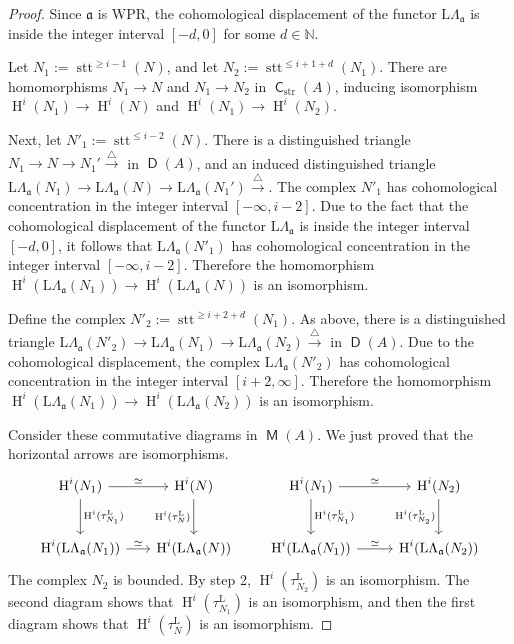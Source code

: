 \documentclass[10pt]{amsart}
\theoremstyle{definition}
\numberwithin{equation}{section}
\newcommand{\xar}{\xrightarrow}
\newcommand{\opn}{\operatorname}
\newcommand{\cat}[1]{\operatorname{\mathsf{#1}}}
\newcommand{\mfrak}[1]{\mathfrak{#1}}
\newcommand{\mrm}[1]{\mathrm{#1}}
\newcommand{\La}{\Lambda}
\renewcommand{\a}{\mfrak{a}}
\newcommand{\N}{\mathbb{N}}
\begin{document}
\begin{proof}
Since $\a$ is WPR, the cohomological displacement of the functor
$\mrm{L} \La_{\a}$ is inside the integer interval $[-d, 0]$ for some
$d \in \N$.

Let
$N_1 := \opn{stt}^{\geq i - 1}(N)$, and let
$N_2 := \opn{stt}^{\leq i + 1 + d}(N_1)$.
There are homomorphisms $N_1 \to N$ and $N_1 \to N_2$ in
$\cat{C}_{\mrm{str}}(A)$, inducing isomorphism
$\opn{H}^i(N_1) \to \opn{H}^i(N)$ and
$\opn{H}^i(N_1) \to \opn{H}^i(N_2)$.

Next, let $N'_1 := \opn{stt}^{\leq i - 2}(N)$.
There is a distinguished triangle
$N_1 \to N \to N_1' \xar{\triangle}$ in $\cat{D}(A)$,
and an induced distinguished triangle
$\mrm{L} \La_{\a}(N_1) \to \mrm{L} \La_{\a}(N) \to
\mrm{L} \La_{\a}(N_1') \xar{\triangle}$.
The complex $N'_1$ has cohomological concentration in the integer interval
$[-\infty, i - 2]$. Due to the fact that the cohomological  displacement of the
functor $\mrm{L} \La_{\a}$ is inside the integer interval $[-d, 0]$,
it follows that $\mrm{L} \La_{\a}(N'_1)$ has cohomological concentration in the
integer interval $[-\infty, i - 2]$.
Therefore the homomorphism
$\opn{H}^i(\mrm{L} \La_{\a}(N_1)) \to \opn{H}^i(\mrm{L} \La_{\a}(N))$
is an isomorphism.

Define the complex $N'_2 := \opn{stt}^{\geq i + 2 + d}(N_1)$.
As above, there is a distinguished triangle
$\mrm{L} \La_{\a}(N'_2) \to \mrm{L} \La_{\a}(N_1) \to
\mrm{L} \La_{\a}(N_2) \xar{\triangle}$
in $\cat{D}(A)$. Due to the cohomological displacement, the complex
$\mrm{L} \La_{\a}(N'_2)$ has cohomological concentration in the
integer interval $[i + 2, \infty]$.
Therefore the homomorphism
$\opn{H}^i(\mrm{L} \La_{\a}(N_1)) \to \opn{H}^i(\mrm{L} \La_{\a}(N_2))$
is an isomorphism.

Consider these commutative diagrams in $\cat{M}(A)$. We just proved that the
horizontal arrows are isomorphisms.
\begin{equation} \label{eqn:442}
\begin{tikzcd} [column sep = 4ex, row sep = 6ex]
\opn{H}^i(N_1)
\ar[d, "{\opn{H}^i(\tau^{\mrm{L}}_{N_1}})"]
\ar[r, "{\simeq}"]
&
\opn{H}^i(N)
\ar[d, "{\opn{H}^i(\tau^{\mrm{L}}_{N})}"']
\\
\opn{H}^i(\mrm{L} \La_{\a}(N_1))
\ar[r, "{\simeq}"]
&
\opn{H}^i(\mrm{L} \La_{\a}(N))
\end{tikzcd}
\qquad
\begin{tikzcd} [column sep = 6ex, row sep = 6ex]
\opn{H}^i(N_1)
\ar[d, "{\opn{H}^i(\tau^{\mrm{L}}_{N_1}})"]
\ar[r, "{\simeq}"]
&
\opn{H}^i(N_2)
\ar[d, "{\opn{H}^i(\tau^{\mrm{L}}_{N_2})}"']
\\
\opn{H}^i(\mrm{L} \La_{\a}(N_1))
\ar[r, "{\simeq}"]
&
\opn{H}^i(\mrm{L} \La_{\a}(N_2))
\end{tikzcd}
\end{equation}
The complex $N_2$ is bounded. By step 2,
$\opn{H}^i(\tau^{\mrm{L}}_{N_2})$ is an isomorphism.
The second diagram shows that
$\opn{H}^i(\tau^{\mrm{L}}_{N_1})$ is an isomorphism, and then the first
diagram shows that
$\opn{H}^i(\tau^{\mrm{L}}_{N})$ is an isomorphism.
\end{proof}
\end{document}
